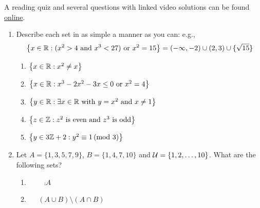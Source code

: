 \begin{exercises}{}{}
	A reading quiz and several questions with linked video solutions can be found \href{http://www.math.uci.edu/~ndonalds/math13/selftest/4-2-union.html}{online}.
	
\begin{enumerate}
  \item Describe each set in as simple a manner as you can: e.g.,
	\[
		\bigl\{x\in\mathbb{R}:(x^2>4\text{ and } x^3<27)\text{ or } x^2=15\bigr\}=(-\infty,-2)\cup (2,3)\cup\{\sqrt{15}\}
	\]
  \begin{enumerate}
	 	\item $\bigl\{x\in\mathbb{R}:x^2\neq x\bigr\}$
		\item $\bigl\{x\in\mathbb{R}:x^3-2x^2-3x\le 0\text{ or }x^2=4\bigl\}$
		\item $\bigl\{y\in\mathbb{R}:\exists x\in\mathbb{R} \text{ with }y=x^2 \text{ and }x\neq 1\bigl\}$
		\item $\bigl\{z\in\mathbb{Z}:z^2\text{ is even and $z^3$ is odd}\bigl\}$
		\item $\bigl\{y\in 3\mathbb{Z}+2:y^2\equiv 1\negthickspace\pmod{3}\bigl\}$
	\end{enumerate}
  
  \item Let $A=\{1,3,5,7,9\}$, $B=\{1,4,7,10\}$ and $\mathcal{U}=\{1,2,\ldots,10\}$. What are the following sets?
    \begin{enumerate}
	  	\item {} \  \  \ $\comp A$ 
	  	\setcounter{enumii}{4}
	  	\item {} \  \ $(A\cup B)\setminus (A\cap B)$
		\end{enumerate}
	
  	

	

\end{enumerate}
\end{exercises}
